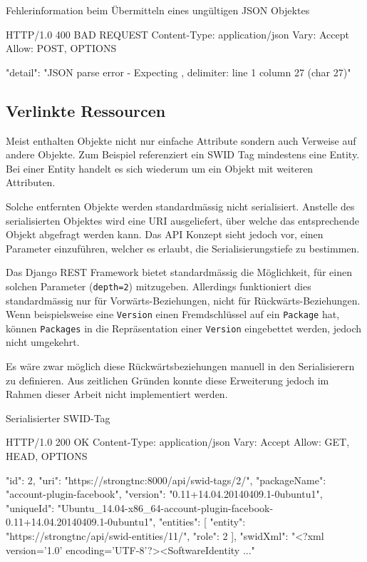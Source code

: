 \begin{listing}[H]
\caption{Fehlerinformation beim Übermitteln eines ungültigen JSON Objektes}
\begin{httpcode}
HTTP/1.0 400 BAD REQUEST
Content-Type: application/json
Vary: Accept
Allow: POST, OPTIONS

{
    "detail": "JSON parse error - Expecting , delimiter: line 1 column 27 (char 27)"
}
\end{httpcode}
\end{listing}

\subsection{Verlinkte Ressourcen}

Meist enthalten Objekte nicht nur einfache Attribute sondern auch Verweise auf
andere Objekte. Zum Beispiel referenziert ein SWID Tag mindestens eine Entity.
Bei einer Entity handelt es sich wiederum um ein Objekt mit weiteren Attributen.

Solche entfernten Objekte werden standardmässig nicht serialisiert. Anstelle des
serialisierten Objektes wird eine URI ausgeliefert, über welche das
entsprechende Objekt abgefragt werden kann. Das API Konzept sieht jedoch vor,
einen Parameter einzuführen, welcher es erlaubt, die Serialisierungstiefe zu
bestimmen.

Das Django REST Framework bietet standardmässig die Möglichkeit, für einen
solchen Parameter (\zb \texttt{depth=2}) mitzugeben. Allerdings funktioniert
dies standardmässig nur für Vorwärts-Beziehungen, nicht für
Rückwärts-Beziehungen. Wenn beispielsweise eine \texttt{Version} einen
Fremdschlüssel auf ein \texttt{Package} hat, können \texttt{Packages} in die
Repräsentation einer \texttt{Version} eingebettet werden, jedoch nicht
umgekehrt.

Es wäre zwar möglich diese Rückwärtsbeziehungen manuell in den Serialisierern zu
definieren. Aus zeitlichen Gründen konnte diese Erweiterung jedoch im Rahmen
dieser Arbeit nicht implementiert werden.

\begin{listing}[H]
\caption{Serialisierter SWID-Tag}
\begin{httpcode}
HTTP/1.0 200 OK
Content-Type: application/json
Vary: Accept
Allow: GET, HEAD, OPTIONS

{
    "id": 2, 
    "uri": "https://strongtnc:8000/api/swid-tags/2/", 
    "packageName": "account-plugin-facebook", 
    "version": "0.11+14.04.20140409.1-0ubuntu1", 
    "uniqueId": "Ubuntu_14.04-x86_64-account-plugin-facebook-0.11+14.04.20140409.1-0ubuntu1", 
    "entities": [
        {
            "entity": "https://strongtnc/api/swid-entities/11/", 
            "role": 2
        }
    ], 
    "swidXml": "<?xml version='1.0' encoding='UTF-8'?>\n<SoftwareIdentity ..."
}
\end{httpcode}
\end{listing}


